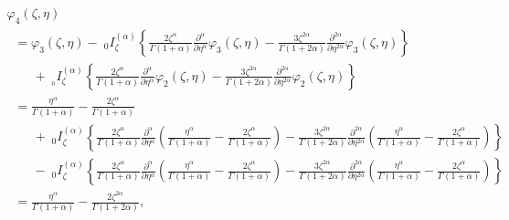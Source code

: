 \documentclass[10pt]{NSP1}
\begin{document}
\begin{equation}
\label{eq47}
\begin{array}{lllllll}
 \varphi _4 \left( {\zeta ,\eta } \right) \\
\;\; =\varphi _3 \left( {\zeta ,\eta } \right)-\; _0I_\zeta ^{\left( \alpha
\right)}\left\{ {\frac{2\zeta ^\alpha }{\Gamma \left( {1+\alpha }
\right)}\frac{\partial ^\alpha }{\partial \eta ^\alpha }\varphi _3 \left(
{\zeta ,\eta } \right)-\frac{3\zeta ^{2\alpha }}{\Gamma \left( {1+2\alpha }
\right)}\frac{\partial ^{2\alpha }}{\partial \eta ^{2\alpha }}\varphi _3
\left( {\zeta ,\eta } \right)} \right\} \\
\qquad+\;_{_0 }I_\zeta ^{\left( \alpha \right)}\left\{ {\frac{2\zeta ^\alpha
}{\Gamma \left( {1+\alpha } \right)}\frac{\partial ^\alpha }{\partial \eta
^\alpha }\varphi _2 \left( {\zeta ,\eta } \right)-\frac{3\zeta ^{2\alpha
}}{\Gamma \left( {1+2\alpha } \right)}\frac{\partial ^{2\alpha }}{\partial
\eta ^{2\alpha }}\varphi _2 \left( {\zeta ,\eta } \right)} \right\} \\
\;\; =\frac{\eta ^\alpha }{\Gamma \left( {1+\alpha } \right)}-\frac{2\zeta
^\alpha }{\Gamma \left( {1+\alpha } \right)} \\
\qquad +\; _0I_\zeta ^{\left( \alpha \right)}\left\{ {\frac{2\zeta ^\alpha
}{\Gamma \left( {1+\alpha } \right)}\frac{\partial ^\alpha }{\partial \eta
^\alpha }\left( {\frac{\eta ^\alpha }{\Gamma \left( {1+\alpha }
\right)}-\frac{2\zeta ^\alpha }{\Gamma \left( {1+\alpha } \right)}}
\right)-\frac{3\zeta ^{2\alpha }}{\Gamma \left( {1+2\alpha }
\right)}\frac{\partial ^{2\alpha }}{\partial \eta ^{2\alpha }}\left(
{\frac{\eta ^\alpha }{\Gamma \left( {1+\alpha } \right)}-\frac{2\zeta
^\alpha }{\Gamma \left( {1+\alpha } \right)}} \right)} \right\} \\
\qquad -\;_0I_\zeta ^{\left( \alpha \right)}\left\{ {\frac{2\zeta ^\alpha
}{\Gamma \left( {1+\alpha } \right)}\frac{\partial ^\alpha }{\partial \eta
^\alpha }\left( {\frac{\eta ^\alpha }{\Gamma \left( {1+\alpha }
\right)}-\frac{2\zeta ^\alpha }{\Gamma \left( {1+\alpha } \right)}}
\right)-\frac{3\zeta ^{2\alpha }}{\Gamma \left( {1+2\alpha }
\right)}\frac{\partial ^{2\alpha }}{\partial \eta ^{2\alpha }}\left(
{\frac{\eta ^\alpha }{\Gamma \left( {1+\alpha } \right)}-\frac{2\zeta
^\alpha }{\Gamma \left( {1+\alpha } \right)}} \right)} \right\} \\
\;\; =\frac{\eta ^\alpha }{\Gamma \left( {1+\alpha } \right)}-\frac{2\zeta
^{2\alpha }}{\Gamma \left( {1+2\alpha } \right)} ,\\
\end{array}
\end{equation}
\end{document}
